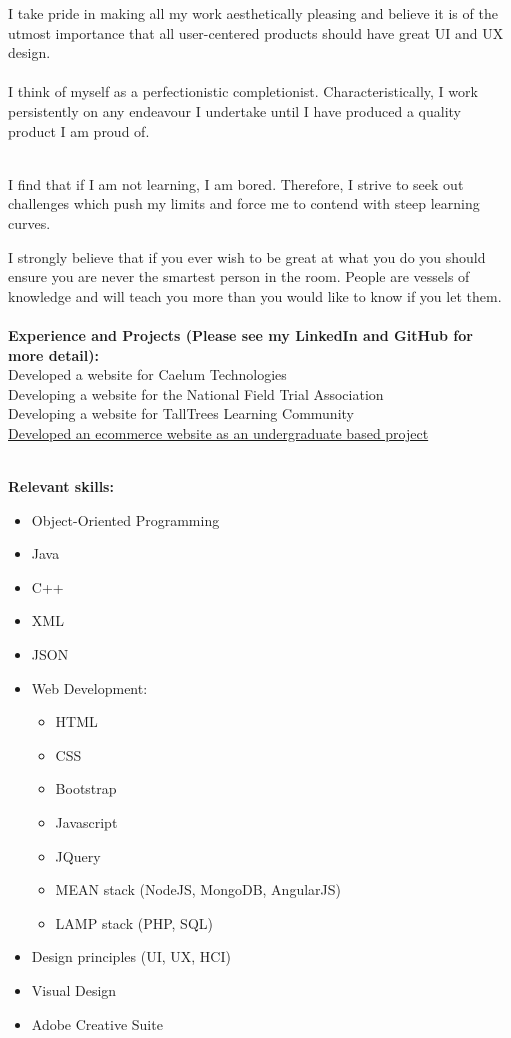 \documentclass[12pt,a4paper]{article}
\begin{document}
		I take pride in making all my work aesthetically pleasing and believe it is of the utmost importance that all user-centered products should have great UI and UX design.\\\\
I think of myself as a perfectionistic completionist. Characteristically, I work persistently on any endeavour I undertake until I have produced a quality product I am proud of.\\\\
\parbox{\textwidth}{I find that if I am not learning, I am bored. Therefore, I strive to seek out challenges which push my limits and force me to contend with steep learning curves.\\}
I strongly believe that if you ever wish to be great at what you do you should ensure you are never the smartest person in the room. People are vessels of knowledge and will teach you more than you would like to know if you let them.\\\\
		\textbf{\small Experience and Projects (Please see my LinkedIn and GitHub for more detail):}\\
		Developed a website for Caelum Technologies\\
		Developing a website for the National Field Trial Association\\
		Developing a website for TallTrees Learning Community\\
		\href{http://77-breedt.000webhostapp.com}{Developed an ecommerce website as an undergraduate based project}\\\\
		\parbox{\textwidth}{		
			\textbf{\small Relevant skills:}
			\begin{itemize}\itemsep0em
				\item Object-Oriented Programming
				\item Java
				\item C++
				\item XML
				\item JSON
				\item Web Development:
				\begin {itemize}\itemsep0em
					\item HTML
					\item CSS
					\item Bootstrap
					\item Javascript
					\item JQuery
					\item MEAN stack (NodeJS, MongoDB, AngularJS)
					\item LAMP stack (PHP, SQL)
				\end {itemize}
				\item Design principles (UI, UX, HCI)
				\item Visual Design
				\item Adobe Creative Suite

			\end{itemize}
		}
\end{document}
